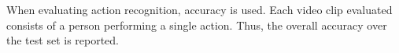 \documentclass[twoside]{article}
\begin{document}
\begin{multicols}{2}
When evaluating action recognition, accuracy is used.
Each video clip evaluated consists of a person performing a single action.
Thus, the overall accuracy over the test set is reported.





\end{multicols}
\end{document}
